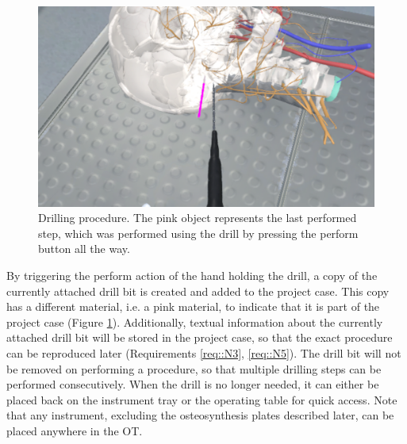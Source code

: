 \begin{figure}[ht]
    \centering
    \includegraphics[width=\linewidth]{images/implementation/features/procedures/drilling.png}
    \caption{\label{fig::FeatureDrilling}Drilling procedure. The pink object represents the last performed step, which was performed using the drill by pressing 
    the perform button all the way.}
\end{figure}

By triggering the perform action of the hand holding the drill, a copy of the currently attached drill bit is created and added to the project case. 
This copy has a different material, i.e. a pink material, to indicate that it is part of the project case (Figure \ref{fig::FeatureDrilling}).
Additionally, textual information about the currently attached drill bit will be stored in the project case, so that the exact procedure can be reproduced later (Requirements \ref{req::N3}, \ref{req::N5}).
The drill bit will not be removed on performing a procedure, so that multiple drilling steps can be performed consecutively.
When the drill is no longer needed, it can either be placed back on the instrument tray or the operating table for quick access.
Note that any instrument, excluding the osteosynthesis plates described later, can be placed anywhere in the OT.